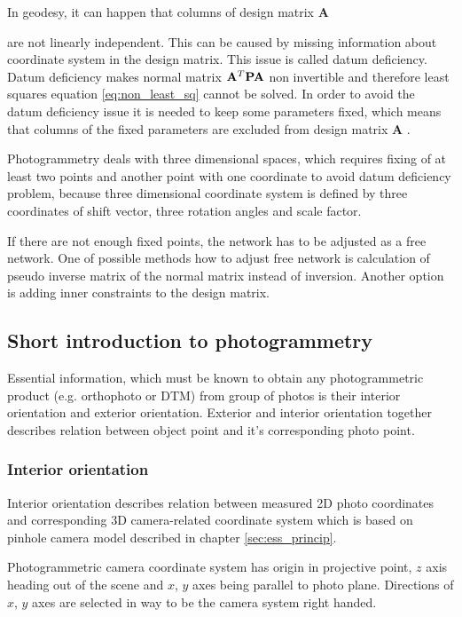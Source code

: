 \documentclass[a4paper,12pt]{article}
\newcommand{\ematr}[1]{
{\bf #1}
}
\begin{document}

In geodesy, it can happen that columns of design matrix \ematr{A}
are not linearly independent. This can be caused by missing information
about coordinate system in the design matrix. This issue is called datum deficiency.
Datum deficiency makes normal matrix $ \ematr{A}^{T} \ematr{P} \ematr{A}$ non invertible and therefore 
least squares equation \eqref{eq:non_least_sq} cannot be solved.
In order to avoid the datum deficiency issue it is needed to keep some parameters fixed, 
which means that columns of the fixed parameters are excluded from design matrix\ematr{A}.

Photogrammetry deals with three dimensional spaces, which requires fixing of at least  
two points and another point with one coordinate to avoid datum deficiency problem, because
three dimensional coordinate system is defined by three coordinates of shift vector, three rotation angles and scale factor. 

If there are not enough fixed points, the network has to be adjusted as a free network.
One of possible methods how to adjust free network is calculation of pseudo inverse matrix of the normal matrix instead of
inversion. Another option is adding inner constraints to the design matrix.

\subsection{Short introduction to photogrammetry}

Essential information, which must be known to obtain any photogrammetric
 product (e.g. orthophoto or DTM) from group of photos is their interior orientation and exterior orientation.
Exterior and interior orientation together describes relation between object point and
it's corresponding photo point.

\subsubsection{Interior orientation}

Interior orientation describes relation between measured 2D photo coordinates 
and corresponding 3D camera-related coordinate system which is based on pinhole camera model described in chapter \ref{sec:ess_princip}.

Photogrammetric camera coordinate system has origin in projective point,
$z$ axis heading out of the scene  and $x$, $y$ axes being parallel to photo plane. Directions of 
$x$, $y$ axes are selected in way to be the camera system right handed.
\end{document}
